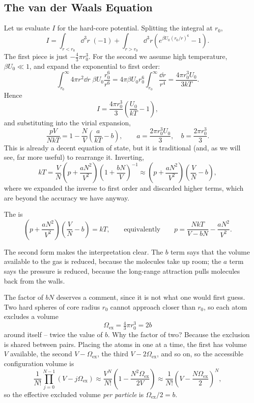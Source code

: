 \documentclass[a4paper]{scrartcl}
\begin{document}
\subsection{The van der Waals Equation}\label{sec:vdwderive}

Let us evaluate $I$ for the hard-core potential. Splitting the integral at $r_0$,
$$
I = \int_{r<r_0}\dd^3 r\;(-1) + \int_{r>r_0}\dd^3 r\left(e^{\beta U_0 (r_0/r)^6}-1\right).
$$
The first piece is just $-\tfrac 43 \pi r_0^3$. For the second we assume high temperature, $\beta U_0 \ll 1$, and expand the exponential to first order:
$$
\int_{r_0}^\infty 4\pi r^2 \dd r\; \beta U_0 \frac{r_0^6}{r^6} = 4\pi \beta U_0 r_0^6 \int_{r_0}^\infty \frac{\dd r}{r^4} = \frac{4\pi r_0^3 U_0}{3kT}.
$$
Hence
$$
I = \frac{4\pi r_0^3}{3}\left(\frac{U_0}{kT}-1\right),
$$
and substituting into the virial expansion,
$$
\frac{pV}{NkT} = 1 - \frac NV\left(\frac{a}{kT}-b\right), \qquad a = \frac{2\pi r_0^3 U_0}{3}, \quad b = \frac{2\pi r_0^3}{3}.
$$
This is already a decent equation of state, but it is traditional (and, as we will see, far more useful) to rearrange it. Inverting,
$$
kT = \frac VN\left(p + \frac{aN^2}{V^2}\right)\left(1 + \frac{bN}{V}\right)^{-1} \approx \left(p + \frac{aN^2}{V^2}\right)\left(\frac VN - b\right),
$$
where we expanded the inverse to first order and discarded higher terms, which are beyond the accuracy we have anyway.

\begin{definition}
	The  is
	$$
	\left(p + \frac{aN^2}{V^2}\right)\left(\frac VN - b\right) = kT, \qquad \text{equivalently} \qquad p = \frac{NkT}{V - bN} - \frac{aN^2}{V^2}.
	$$
\end{definition}

The second form makes the interpretation clear. The $b$ term says that the volume available to the gas is reduced, because the molecules take up room; the $a$ term says the pressure is reduced, because the long-range attraction pulls molecules back from the walls.

The factor of $bN$ deserves a comment, since it is not what one would first guess. Two hard spheres of core radius $r_0$ cannot approach closer than $r_0$, so each atom excludes a volume
$$
\Omega_{\mathrm{ex}} = \tfrac 43 \pi r_0^3 = 2b
$$
around itself -- twice the value of $b$. Why the factor of two? Because the exclusion is shared between pairs. Placing the atoms in one at a time, the first has volume $V$ available, the second $V - \Omega_{\mathrm{ex}}$, the third $V - 2\Omega_{\mathrm{ex}}$, and so on, so the accessible configuration volume is
$$
\frac{1}{N!}\prod_{j=0}^{N-1}\left(V - j\Omega_{\mathrm{ex}}\right) \approx \frac{V^N}{N!}\left(1 - \frac{N^2\Omega_{\mathrm{ex}}}{2V}\right) \approx \frac{1}{N!}\left(V - \frac{N\Omega_{\mathrm{ex}}}{2}\right)^N,
$$
so the effective excluded volume \emph{per particle} is $\Omega_{\mathrm{ex}}/2 = b$.
\end{document}
